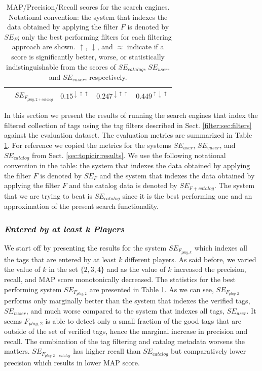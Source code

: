 \begin{table}[tb]
\begin{footnotesize}
\begin{tabular}{l|l|l|l|l}
\cline{2-5}
&$SE_{F_{play,2 + catalog}}$ & $0.15^{\downarrow\uparrow\uparrow}$ & $0.247^{\downarrow\uparrow\uparrow}$ & $0.449^{\uparrow\downarrow\uparrow}$\\
\bottomrule
\end{tabular}
\caption{MAP/Precision/Recall scores for the search engines. Notational convention: the system that indexes the data obtained by applying the filter $F$ is denoted by $SE_F$; only the best performing filters for each filtering approach are shown. $\uparrow$, $\downarrow$, and $\approx$ indicate if a score is significantly better, worse, or statistically indistinguishable from the scores of $SE_{catalog}$, $SE_{user}$, and $SE_{vuser}$, respectively.}
\label{filter:table:map-prec-rec}
\end{footnotesize}
\end{table}

In this section we present the results of running the search engines that index the filtered collection of tags using the tag filters described in Sect. \ref{filter:sec:filters} against the evaluation dataset. The evaluation metrics are summarized in Table \ref{filter:table:map-prec-rec}. For reference we copied the metrics for the systems $SE_{user}$, $SE_{vuser}$, and $SE_{catalog}$ from Sect. \ref{sec:topicir:results}. We use the following notational convention in the table: the system that indexes the data obtained by applying the filter $F$ is denoted by $SE_F$ and the system that indexes the data obtained by applying the filter $F$ and the catalog data is denoted by $SE_{F+catalog}$. The system that we are trying to beat is $SE_{catalog}$ since it is the best performing one and an approximation of the present search functionality.

\subsubsection{\textit{Entered by at least \textbf{k} Players}}
We start off by presenting the results for the system $SE_{F_{play,k}}$ which indexes all the tags that are entered by at least $k$ different players. As said before, we varied the value of $k$ in the set $\{2,3,4\}$ and as the value of $k$ increased the precision, recall, and MAP score monotonically decreased. The statistics for the best performing system $SE_{F_{play,2}}$ are presented in Table \ref{filter:table:map-prec-rec}. As we can see, $SE_{F_{play,2}}$ performs only marginally better than the system that indexes the verified tags,  $SE_{vuser}$, and much worse compared to the system that indexes all tags, $SE_{user}$. It seems $F_{play,2}$ is able to detect only a small fraction of the good tags that are outside of the set of verified tags, hence the marginal increase in precision and recall.
The combination of the tag filtering and catalog metadata worsens the matters. $SE_{F_{play,2 + catalog}}$ has higher recall than $SE_{catalog}$ but comparatively lower precision which results in lower MAP score.


